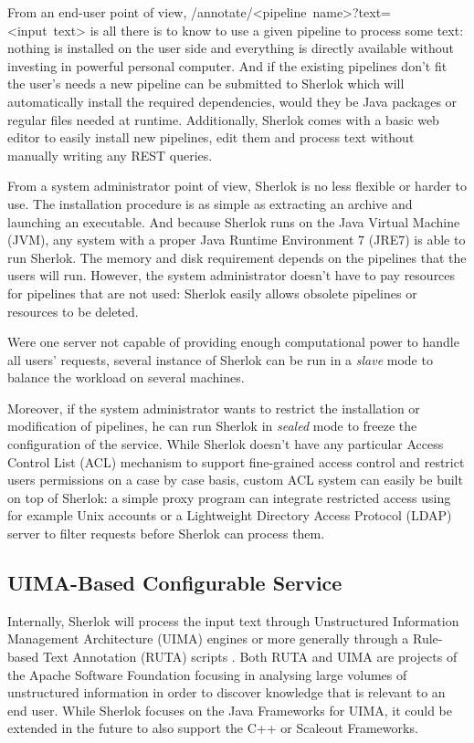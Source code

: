 \documentclass{article}
\newcommand{\REST}[1]{\textsf{#1}}
\begin{document}
From an end-user point of view, \REST{/annotate/<pipeline~name>?text=<input~text>} is all there is to
know to use a given pipeline to process some text: nothing is installed on the user side and
everything is directly available without investing in powerful personal computer. And if the
existing pipelines don't fit the user's needs a new pipeline can be submitted to Sherlok which will
automatically install the required dependencies, would they be Java packages or regular files needed
at runtime. Additionally, Sherlok comes with a basic web editor to easily install new pipelines, edit them
and process text without manually writing any REST queries.

From a system administrator point of view, Sherlok is no less flexible or harder to use. The
installation procedure is as simple as extracting an archive and launching an executable. And
because Sherlok runs on the Java Virtual Machine (JVM), any system with a proper Java Runtime
Environment 7 (JRE7) is able to run Sherlok. The memory and disk requirement depends on the
pipelines that the users will run. However, the system administrator doesn't have to pay resources
for pipelines that are not used: Sherlok easily allows obsolete pipelines or resources to be
deleted.

Were one server not capable of providing enough computational power to handle all users' requests,
several instance of Sherlok can be run in a \emph{slave} mode to balance the workload on several
machines.

Moreover, if the system administrator wants to restrict the installation or modification of
pipelines, he can run Sherlok in \emph{sealed} mode to freeze the configuration of the service.
While Sherlok doesn't have any particular Access Control List (ACL) mechanism to support
fine-grained access control and restrict users permissions on a case by case basis, custom ACL
system can easily be built on top of Sherlok: a simple proxy program can integrate restricted access
using for example Unix accounts or a Lightweight Directory Access Protocol (LDAP) server to filter
requests before Sherlok can process them.

\subsection{UIMA-Based Configurable Service}

Internally, Sherlok will process the input text through Unstructured Information Management
Architecture (UIMA) \cite{uima} engines or more generally through a Rule-based Text Annotation
(RUTA) scripts \cite{ruta}. Both RUTA and UIMA are projects of the Apache Software Foundation
\cite{apachefundation} focusing in analysing large volumes of unstructured information in order to
discover knowledge that is relevant to an end user. While Sherlok focuses on the Java Frameworks for
UIMA, it could be extended in the future to also support the C++ or Scaleout Frameworks.
\end{document}
